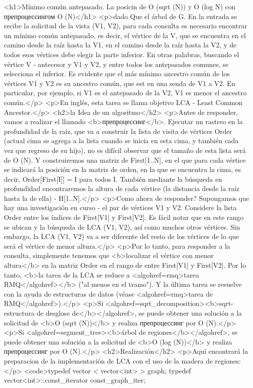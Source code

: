 <h1>Mínimo común antepasado. La posicin de O (sqrt (N)) y O (log N) con препроцессингом O (N)</h1>
<p>dado Que el árbol de G. En la entrada se recibe la solicitud de la vista (V1, V2), para cada consulta es necesario encontrar un mínimo común antepasado, es decir, el vértice de la V, que se encuentra en el camino desde la raíz hasta la V1, en el camino desde la raíz hasta la V2, y de todos esos vértices debe elegir la parte inferior. En otras palabras, buscando el vértice V - antecesor y V1 y V2, y entre todos los antepasados comunes, se selecciona el inferior. Es evidente que el más mínimo ancestro común de los vértices V1 y V2 es su ancestro común, que est en una senda de V1 a V2. En particular, por ejemplo, si V1 es el antepasado de la V2, V1 es menor el ancestro común.</p>
<p>En inglés, esta tarea se llama objetivo LCA - Least Common Ancestor.</p>
<h2>la Idea de un algoritmo</h2>
<p>Antes de responder, vamos a realizar el llamado <b>препроцессинг</b>. Ejecutar un rastreo en la profundidad de la raíz, que va a construir la lista de visita de vértices Order (actual cima se agrega a la lista cuando se inicia en esta cima, y también cada vez que regreso de su hijo), no es difícil observar que el tamaño de esta lista será de O (N). Y construiremos una matriz de First[1..N], en el que para cada vértice se indicará la posición en la matriz de orden, en la que se encuentra la cima, es decir, Order[First[I]] = I para todos I. También mediante la búsqueda en profundidad encontraremos la altura de cada vértice (la distancia desde la raíz hasta la de ella) - H[1..N].</p>
<p>Como ahora de responder? Supongamos que hay una investigación en curso - el par de vértices V1 y V2. Considere la lista Order entre los índices de First[V1] y First[V2]. Es fácil notar que en este rango se ubican y la búsqueda de LCA (V1, V2), así como muchos otros vértices. Sin embargo, la LCA (V1, V2) va a ser diferente del resto de los vértices de lo que será el vértice de menor altura.</p>
<p>Por lo tanto, para responder a la consulta, simplemente tenemos que <b>localizar el vértice con menor altura</b> en la matriz Order en el rango de entre First[V1] y First[V2]. Por lo tanto, <b>la tarea de la LCA se reduce a <algohref=rmq>tarea RMQ</algohref></b> ("al menos en el tramo"). Y la última tarea se resuelve con la ayuda de estructuras de datos (véase <algohref=rmq>tarea de RMQ</algohref>).</p>
<p>Si <algohref=sqrt_decomposition><b>sqrt-estructura de desglose de</b></algohref>, se puede obtener una solución a la solicitud de <b>O (sqrt (N))</b> y realiza препроцессинг por O (N).</p>
<p>Si <algohref=segment_tree><b>árbol de regiones</b></algohref>, se puede obtener una solución a la solicitud de <b>O (log (N))</b> y realiza препроцессинг por O (N).</p>
<h2>Realización</h2>
<p>Aquí encontrará la preparacion de la implementación de LCA con el uso de la madera de regiones:</p>
<code>typedef vector < vector<int> > graph;
typedef vector<int>::const_iterator const_graph_iter;


